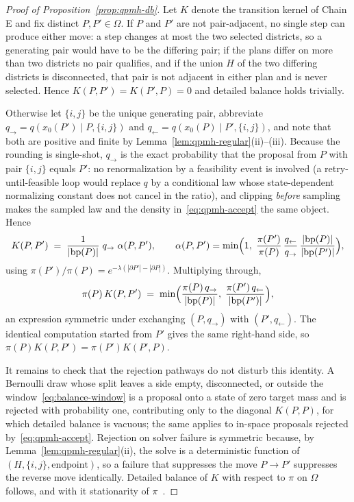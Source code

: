 \documentclass[11pt]{article}
\begin{document}
\begin{proof}[Proof of Proposition~\ref{prop:qpmh-db}]
Let $K$ denote the transition kernel of Chain E and fix distinct
$P, P' \in \Omega$. If $P$ and $P'$ are not pair-adjacent, no single
step can produce either move: a step changes at most the two selected
districts, so a generating pair would have to be the differing pair;
if the plans differ on more than two districts no pair qualifies, and
if the union $H$ of the two differing districts is disconnected, that
pair is not adjacent in either plan and is never selected. Hence
$K(P, P') = K(P', P) = 0$ and detailed balance holds trivially.

Otherwise let $\{i,j\}$ be the unique generating pair, abbreviate
$q_{\to} = q(x_0(P') \mid P, \{i,j\})$ and
$q_{\gets} = q(x_0(P) \mid P', \{i,j\})$, and note that both are
positive and finite by Lemma~\ref{lem:qpmh-regular}(ii)--(iii).
Because the rounding is single-shot, $q_{\to}$ is the exact
probability that the proposal from $P$ with pair $\{i,j\}$ equals
$P'$: no renormalization by a feasibility event is involved (a
retry-until-feasible loop would replace $q$ by a conditional law
whose state-dependent normalizing constant does not cancel in the
ratio), and clipping \emph{before} sampling makes the sampled law and
the density in~\eqref{eq:qpmh-accept} the same object. Hence
\[
  K(P, P') \;=\; \frac{1}{|\mathrm{bp}(P)|}\; q_{\to}\;
  \alpha(P, P'), \qquad
  \alpha(P, P') = \min\Bigl(1,\;
  \frac{\pi(P')}{\pi(P)}\,
  \frac{q_{\gets}}{q_{\to}}\,
  \frac{|\mathrm{bp}(P)|}{|\mathrm{bp}(P')|}\Bigr),
\]
using $\pi(P')/\pi(P) = e^{-\lambda(|\partial P'| - |\partial P|)}$.
Multiplying through,
\[
  \pi(P)\, K(P, P') \;=\;
  \min\Bigl(
  \frac{\pi(P)\, q_{\to}}{|\mathrm{bp}(P)|},\;
  \frac{\pi(P')\, q_{\gets}}{|\mathrm{bp}(P')|}
  \Bigr),
\]
an expression symmetric under exchanging $(P, q_{\to})$ with
$(P', q_{\gets})$. The identical computation started from $P'$ gives
the same right-hand side, so
$\pi(P) K(P, P') = \pi(P') K(P', P)$.

It remains to check that the rejection pathways do not disturb this
identity. A Bernoulli draw whose split leaves a side empty,
disconnected, or outside the window~\eqref{eq:balance-window} is a
proposal onto a state of zero target mass and is rejected with
probability one, contributing only to the diagonal $K(P, P)$, for
which detailed balance is vacuous; the same applies to in-space
proposals rejected by~\eqref{eq:qpmh-accept}. Rejection on solver
failure is symmetric because, by
Lemma~\ref{lem:qpmh-regular}(ii), the solve is a deterministic
function of $(H, \{i,j\}, \text{endpoint})$, so a failure that
suppresses the move $P \to P'$ suppresses the reverse move
identically. Detailed balance of $K$ with respect to $\pi$ on
$\Omega$ follows, and with it stationarity of
$\pi$~\cite{tierney1998note}.
\end{proof}
\end{document}
